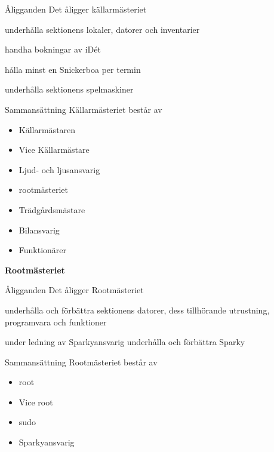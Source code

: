 \documentclass[pdfbookmarks,a4paper,11pt]{article}
\newlength{\itemcollength}
\newenvironment{reglemlista}{%
  \begin{list}{}{%
      \setlength{\labelwidth}{\itemcollength}%
      \setlength{\leftmargin}{\labelwidth + \labelsep}%
      \renewcommand{\makelabel}[1]{%
        \raisebox{0pt}[1ex][0pt]{%
          \makebox[\labelwidth][l]{%
            \parbox[t]{\itemcollength}{%
              \raggedright\hspace{0pt}##1}}}\hfill}%
      }}{%
  \end{list}}
\begin{document}
\begin{reglemlista}

	\item[Åligganden]
	Det åligger källarmästeriet
	\begin{attlista}
		\item underhålla sektionens lokaler, datorer och inventarier
		\item handha bokningar av iDét
		\item hålla minst en Snickerboa per termin
		\item underhålla sektionens spelmaskiner
	\end{attlista}


	\item[Sammansättning]
	Källarmästeriet består av
	\begin{itemize}
		\item Källarmästaren
		\item Vice Källarmästare
		\item Ljud- och ljusansvarig
		\item rootmästeriet
		\item Trädgårdsmästare
        \item Bilansvarig
		\item Funktionärer
	\end{itemize}

	\item[\textbf{Rootmästeriet}]

	\item[Åligganden]
	Det åligger Rootmästeriet
	\begin{attlista}
		\item underhålla och förbättra sektionens datorer, dess tillhörande utrustning, programvara och funktioner
		\item under ledning av Sparkyansvarig underhålla och förbättra Sparky
	\end{attlista}

	\item[Sammansättning]
	Rootmästeriet består av
	\begin{itemize}
		\item root
        \item Vice root
		\item sudo
		\item Sparkyansvarig
	\end{itemize}

\end{reglemlista}
\end{document}
